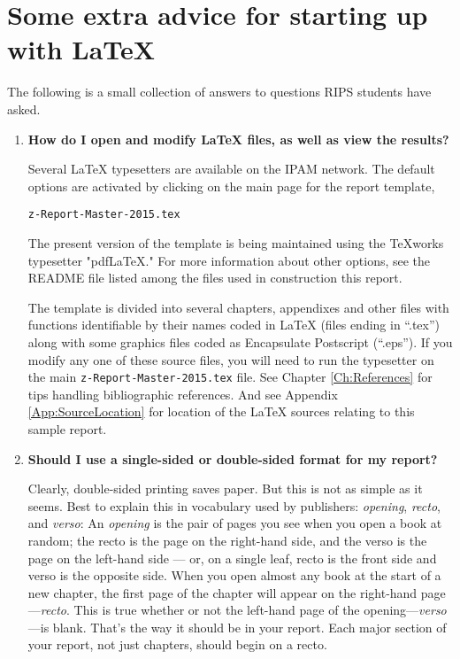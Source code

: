 \chapter{Some extra advice for starting up with {\LaTeX}}\label{Ch:ExtraAdvice}

The following is a small collection of answers to questions RIPS students have asked.

\begin{enumerate}

\item {\bf How do I open and modify {\LaTeX} files, as well as view the results?}

Several {\LaTeX} typesetters are available on the IPAM network.
The default options are activated by clicking on the  main page for the report template,\\ 

\centerline{\texttt{z-Report-Master-2015.tex}}
\vspace{5pt}

The present version of the template is being maintained using the TeXworks typesetter "pdfLaTeX."
For more information about other options, see the  README file listed among the files used in construction this report.

\hspace{15pt} The template is divided into several chapters, appendixes and other files with functions identifiable by their names coded in {\LaTeX} (files ending in ``.tex'') along with some graphics files coded as Encapsulate Postscript (``.eps'').  
If you modify any one of these source files, you will need to run the typesetter on the main \texttt{z-Report-Master-2015.tex} file.
See Chapter \ref{Ch:References} for tips handling bibliographic references.
And see Appendix \ref{App:SourceLocation} for location of the {\LaTeX} sources relating to this sample report.

\item {\bf Should I use a single-sided or double-sided format for my report?}

Clearly, double-sided printing saves paper.
But this is not as simple as it seems.
Best to explain this in vocabulary used by publishers: {\em opening}, {\em recto}, and {\em verso}:
An {\em opening} is the pair of pages you see when you open a book at random; the recto is the page on the right-hand side, and the verso is the page on the left-hand side --- or, on a single leaf, recto is the front side and verso is the opposite side.
When you open almost any book at the start of a new chapter, the first page of the chapter will appear on the right-hand page---{\em recto}.
This is true whether or not the left-hand page of the opening---{\em verso}---is blank.
That's the way it should be in your report.
Each major section of your report, not just chapters, should begin on a recto.


\end{enumerate}
